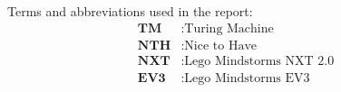 
Terms and abbreviations used in the report:
\begin{align*}
	\textbf{TM} &: \text{Turing Machine} \\
    \textbf{NTH} &: \text{Nice to Have} \\
    \textbf{NXT} &: \text{Lego Mindstorms NXT 2.0} \\
    \textbf{EV3} &: \text{Lego Mindstorms EV3} \\  
\end{align*}